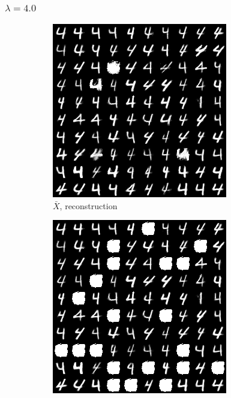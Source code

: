 \documentclass{beamer}
\theoremstyle{plain}
\theoremstyle{definition}
\theoremstyle{remark}
\begin{document}
\begin{frame}
	\frametitle{$\lambda=4.0$}
	\begin{figure}
		\centering
		\begin{subfigure}[b]{0.3\textwidth}
			\centering
			\includegraphics[width=\textwidth]{Images/l21R_4.png}
			\caption{$\bar{X}$, reconstruction}
		\end{subfigure}
		\hfill
		\begin{subfigure}[b]{0.3\textwidth}
			\centering
			\includegraphics[width=\textwidth]{Images/l21L_4.png}

\end{subfigure}
\end{figure}
\end{frame}
\end{document}
